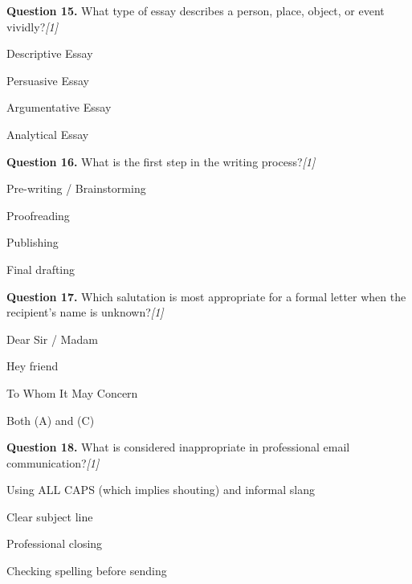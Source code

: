 \documentclass[11pt,a4paper]{article}
\newcommand{\pts}[1]{\hfill   \textit{[#1]}}
\begin{document}
\medskip




\noindent   \textbf{Question 15.} What type of essay describes a person, place, object, or event vividly?\pts{1}

\begin{parts}
  \item Descriptive Essay
  \item Persuasive Essay
  \item Argumentative Essay
  \item Analytical Essay
\end{parts}

\medskip




\noindent   \textbf{Question 16.} What is the first step in the writing process?\pts{1}

\begin{parts}
  \item Pre-writing / Brainstorming
  \item Proofreading
  \item Publishing
  \item Final drafting
\end{parts}

\medskip




\noindent   \textbf{Question 17.} Which salutation is most appropriate for a formal letter when the recipient's name is unknown?\pts{1}

\begin{parts}
  \item Dear Sir / Madam
  \item Hey friend
  \item To Whom It May Concern
  \item Both (A) and (C)
\end{parts}

\medskip




\noindent   \textbf{Question 18.} What is considered inappropriate in professional email communication?\pts{1}

\begin{parts}
  \item Using ALL CAPS (which implies shouting) and informal slang
  \item Clear subject line
  \item Professional closing
  \item Checking spelling before sending
\end{parts}
\end{document}
